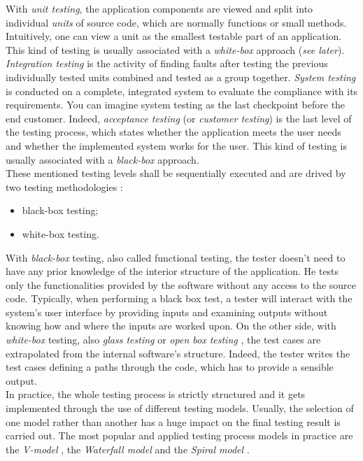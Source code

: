 With \textit{unit testing}, the application components are viewed and split into  individual \textit{units} of source code, which are normally functions or small methods. Intuitively, one can view a unit as the smallest testable part of an application. This kind of testing is usually associated with a \textit{white-box} approach (\textit{see later}).  \textit{Integration testing} is the activity of finding faults after testing the previous individually tested units combined and tested as a group together. \textit{System testing} is conducted on a complete, integrated system to evaluate the compliance with its requirements. You can imagine system testing as the last checkpoint before the end customer. Indeed, \textit{acceptance testing} (or \textit{customer testing}) is the last level of the testing process, which states whether the application meets the user needs and whether the implemented system works for the user. This kind of testing is usually associated with a \textit{black-box} approach. 
\\
These mentioned testing levels shall be sequentially executed and are drived by two testing methodologies \cite{white-box, black-box}: 
\begin{itemize}
\item black-box testing;
\item white-box testing.
\end{itemize} 
With \textit{black-box} testing, also called functional testing, the tester doesn't need to have any prior knowledge of the interior structure of the application. He tests only the functionalities provided by the software without any access to the source code. Typically, when performing a black box test, a tester will interact with the system's user interface by providing inputs and examining outputs without knowing how and where the inputs are worked upon. On the other side, with \textit{white-box} testing, also \textit{glass testing} or \textit{open box testing} \cite{grano}, the test cases are extrapolated from the internal software's structure. Indeed, the tester writes the test cases defining a paths through the code, which has to provide a sensible output. \\
In practice, the whole testing process is strictly structured and it gets implemented through the use of different testing models. Usually, the selection of one model rather than another has a huge impact on the final testing result is carried out. The most popular and applied testing process models in practice are the \textit{V-model} \cite{vmodel}, the \textit{Waterfall model}\cite{waterfallmodel} and the \textit{Spiral model} \cite{spiralmodel}. \\
